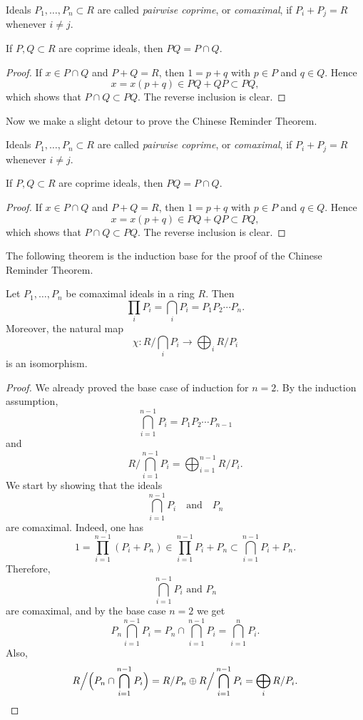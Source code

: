 \begin{definition}
\label{definition-comaximal-ideals}
Ideals $P_1,\dots,P_n\subset R$ are
called {\it pairwise coprime}, or
{\it comaximal},
if $P_i+P_j=R$ whenever $i\neq j$.
\end{definition}

\begin{lemma}
\label{lemma-coprime-ideals-intersection}
If $P,Q\subset R$ are coprime ideals,
then $PQ=P\cap Q$.
\end{lemma}

\begin{proof}
If $x\in P\cap Q$ and $P+Q=R$, then
$1=p+q$ with $p\in P$ and $q\in Q$.
Hence
$$
x=x(p+q)\in PQ+QP\subset PQ,
$$
which shows that $P\cap Q\subset PQ$.
The reverse inclusion is clear.
\end{proof}

\medskip\noindent
Now we make a slight detour to prove the
Chinese Reminder Theorem.

\begin{definition}
\label{definition-comaximal-ideals-duplicate-2}
Ideals $P_1,\dots,P_n\subset R$ are
called {\it pairwise coprime}, or
{\it comaximal},
if $P_i+P_j=R$ whenever $i\neq j$.
\end{definition}

\begin{lemma}
\label{lemma-coprime-ideals-intersection-duplicate-2}
If $P,Q\subset R$ are coprime ideals,
then $PQ=P\cap Q$.
\end{lemma}

\begin{proof}
If $x\in P\cap Q$ and $P+Q=R$, then
$1=p+q$ with $p\in P$ and $q\in Q$.
Hence
$$
x=x(p+q)\in PQ+QP\subset PQ,
$$
which shows that $P\cap Q\subset PQ$.
The reverse inclusion is clear.
\end{proof}

\medskip\noindent
The following theorem is the induction
base for the proof of the Chinese Reminder
Theorem.

\begin{theorem}
\label{theorem-chinese-remainder}
Let $P_1,\dots,P_n$ be comaximal ideals
in a ring $R$. Then
$$
\prod_i P_i=
\bigcap_i P_i=P_1P_2\cdots P_n.
$$
Moreover, the natural map
$$
\chi:R\Big/\bigcap_i P_i\to
\bigoplus_i R/P_i
$$
is an isomorphism.
\end{theorem}

\begin{proof}
We already proved the base case of
induction for $n=2$.
By the induction assumption,
$$
\bigcap_{i=1}^{n-1}P_i=
P_1P_2\cdots P_{n-1}
$$
and
$$
R\Big/\bigcap_{i=1}^{n-1}P_i=
\bigoplus_{i=1}^{n-1}R/P_i.
$$
We start by showing that the ideals
\[
\bigcap_{i=1}^{n-1}P_i
\quad\text{and}\quad P_n
\]
are comaximal. Indeed, one has
$$
1=\prod_{i=1}^{n-1}(P_i+P_n)
\in \prod_{i=1}^{n-1}P_i+P_n
\subset \bigcap_{i=1}^{n-1}P_i+P_n.
$$
Therefore,
\[
\bigcap_{i=1}^{n-1}P_i
\text{ and }P_n
\]
are comaximal, and
by the base case $n=2$ we get
$$
P_n\bigcap_{i=1}^{n-1}P_i=
P_n\cap\bigcap_{i=1}^{n-1}P_i=
\bigcap_{i=1}^nP_i.
$$
Also,
$$
R\Big/\Bigl(P_n\cap\bigcap_{i=1}^{n-1}P_i\Bigr)
=R/P_n\oplus
R\Big/\bigcap_{i=1}^{n-1}P_i
=\bigoplus_i R/P_i.
$$
\end{proof}

